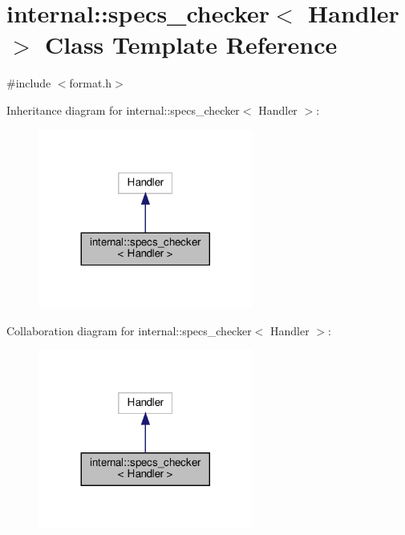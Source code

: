 \hypertarget{classinternal_1_1specs__checker}{}\section{internal\+:\+:specs\+\_\+checker$<$ Handler $>$ Class Template Reference}
\label{classinternal_1_1specs__checker}


{\ttfamily \#include $<$format.\+h$>$}



Inheritance diagram for internal\+:\+:specs\+\_\+checker$<$ Handler $>$\+:
\nopagebreak
\begin{figure}[H]
\begin{center}
\leavevmode
\includegraphics[width=200pt]{classinternal_1_1specs__checker__inherit__graph}
\end{center}
\end{figure}


Collaboration diagram for internal\+:\+:specs\+\_\+checker$<$ Handler $>$\+:
\nopagebreak
\begin{figure}[H]
\begin{center}
\leavevmode
\includegraphics[width=200pt]{classinternal_1_1specs__checker__coll__graph}
\end{center}
\end{figure}
